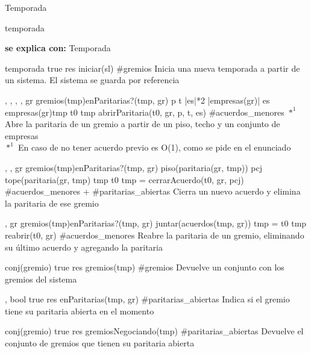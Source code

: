 \begin{interfaz}{Temporada}

\begin{iparamformales}{temporada}

\textbf{\large se explica con:} Temporada

\end{iparamformales}

{}{temporada}
{true}
{res \igobs iniciar(sl)}
{\#gremios}
{Inicia una nueva temporada a partir de un sistema.}
{El sistema se guarda por referencia}

{, , , , }{}
{gr \in gremios(tmp)\ly \neg enParitarias?(tmp, gr) \ly p \leq t \ly |es|*2 \leq |empresas(gr)| \ly es \subseteq empresas(gr)\ly tmp \igobs t0 }
{tmp \igobs abrirParitaria(t0, gr, p, t, es)  }
{\#acuerdos\_menores $*^1$}
{Abre la paritaria de un gremio a partir de un piso, techo y un conjunto de empresas \\
$*^1$ En caso de no tener acuerdo previo es O(1), como se pide en el enunciado}
{}

{,  ,  }{}
{ gr \in gremios(tmp)\lyl enParitarias?(tmp, gr) \ly piso(paritaria(gr, tmp)) \leq pcj \leq tope(paritaria(gr, tmp) \ly tmp \igobs t0 }
{tmp = cerrarAcuerdo(t0, gr, pcj)}
{\#acuerdos\_menores + \#paritarias\_abiertas}
{Cierra un nuevo acuerdo y elimina la paritaria de ese gremio}
{}

{, }{}
{gr \in gremios(tmp)\ly \neg enParitarias?(tmp, gr) \ly \emptyset \neq  juntar(acuerdos(tmp, gr)) \ly tmp = t0 }
{tmp \igobs reabrir(t0, gr) }
{\#acuerdos\_menores}
{Reabre la paritaria de un gremio, eliminando su \'ultimo acuerdo y agregando la paritaria}
{}

{}{conj(gremio)}
{true}
{res \igobs gremios(tmp) }
{\#gremios }
{Devuelve un conjunto con los gremios del sistema}
{}

{, }{bool}
{true}
{ res \igobs enParitarias(tmp, gr) }
{\#paritarias\_abiertas}
{Indica si el gremio tiene su paritaria abierta en el momento}
{}

{}{conj(gremio)}
{true}
{res \igobs gremiosNegociando(tmp)}
{\#paritarias\_abiertas}
{Devuelve el conjunto de gremios que tienen su paritaria abierta }
{}


\end{interfaz}
